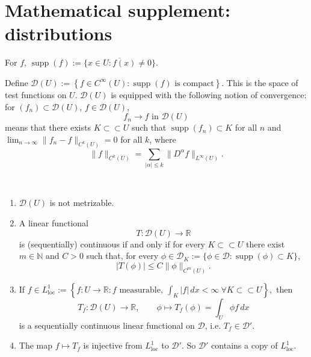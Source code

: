 \section{Mathematical supplement: distributions}


\begin{definition}
For $f$,
$
\operatorname{supp}(f):=\overline{\{x\in U: f(x)\neq 0\}}.
$
\end{definition}

\begin{definition}
Define
$
\mathcal{D}(U):=
\left\{
f\in C^\infty(U): \operatorname{supp}(f)\text{ is compact}
\right\}.
$
This is the space of test functions on $U$.
$\mathcal{D}(U)$ is equipped with the following notion of convergence:
for $(f_n)\subset \mathcal{D}(U)$, $f\in \mathcal{D}(U)$,
$$
f_n\to f \text{ in } \mathcal{D}(U)
$$
means that there exists $K\subset\subset U$ such that
$
\operatorname{supp}(f_n)\subset K
$
for all $n$ and
$
\lim_{n\to\infty} \|f_n-f\|_{C^k(U)}=0
$
for all $k$, where
$$
\|f\|_{C^k(U)}
=
\sum_{|\alpha|\le k}\|D^\alpha f\|_{L^\infty(U)}.
$$
\end{definition}

\begin{claim}\
\begin{enumerate}
    \item $\mathcal{D}(U)$ is not metrizable.
    
    \item A linear functional
    $$
    T:\mathcal{D}(U)\to\mathbb{R}
    $$
    is (sequentially) continuous if and only if for every $K\subset\subset U$ there exist
    $m\in \mathbb{N}$ and $C>0$ such that, for every $\phi\in \mathcal{D}_K
    :=\{\phi\in\mathcal{D}:\operatorname{supp}(\phi)\subset K\}$,
    $$
    |T(\phi)|\le C \|\phi\|_{C^{m}(U)}.
    $$
\end{enumerate}
\end{claim}

\begin{enumerate}
    \setcounter{enumi}{2}
    \item If
    $
    f\in L^1_{\mathrm{loc}}
    :=
    \left\{
    f:U\to \mathbb{R}: f \text{ measurable},\ 
    \int_K |f|\,dx<\infty \ \forall K\subset\subset U
    \right\},
    $
    then
    $$
    T_f:\mathcal{D}(U)\to \mathbb{R},
    \qquad
    \phi\mapsto T_f(\phi)=\int_U \phi f\,dx
    $$
    is a sequentially continuous linear functional on $\mathcal{D}$, i.e. $T_f\in \mathcal{D}'$.

    \item The map
    $
    f\mapsto T_f
    $
    is injective from $L^1_{\mathrm{loc}}$ to $\mathcal{D}'$.
    So $\mathcal{D}'$ contains a copy of $L^1_{\mathrm{loc}}$.
\end{enumerate}

